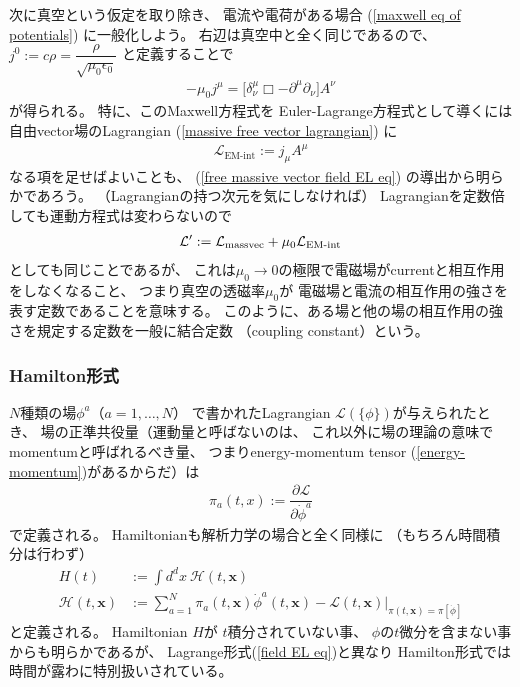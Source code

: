 次に真空という仮定を取り除き、
電流や電荷がある場合
(\ref{maxwell eq of potentials})
に一般化しよう。
右辺は真空中と全く同じであるので、
$j^0 := c \rho
= \dfrac{ \rho }
	{ \sqrt{\mu_0 \epsilon_0} }$
と定義することで
\begin{align}
	- \mu_0 j^\mu
=
    \bigg[
		\delta^\mu_\nu \Box
    - \partial^\mu \partial_\nu
    \bigg] A^\nu
\end{align}
が得られる。
特に、このMaxwell方程式を
Euler-Lagrange方程式として導くには
自由vector場のLagrangian
(\ref{massive free vector lagrangian})
に
\begin{align}
	\mathcal{L}_{\text{EM-int}}
:=
	j_\mu A^\mu
\label{EM int lagrangian}
\end{align}
なる項を足せばよいことも、
(\ref{free massive vector field EL eq})
の導出から明らかであろう。
（Lagrangianの持つ次元を気にしなければ）
Lagrangianを定数倍しても運動方程式は変わらないので
\begin{align}
	\mathcal{L}'
:=
	\mathcal{L}_{\rm massvec}
	+
	\mu_0 \mathcal{L}_{\text{EM-int}}
\end{align}
としても同じことであるが、
これは$\mu_0 \to 0$の極限で電磁場がcurrentと相互作用をしなくなること、
つまり真空の透磁率$\mu_0$が
電磁場と電流の相互作用の強さを表す定数であることを意味する。
このように、ある場と他の場の相互作用の強さを規定する定数を一般に結合定数
（coupling constant）という。

\subsubsection{Hamilton形式}

$N$種類の場$\phi^a$（$a = 1, \dots, N$）
で書かれたLagrangian
$\mathcal{L}(\{ \phi \})$が与えられたとき、
場の正準共役量（運動量と呼ばないのは、
これ以外に場の理論の意味でmomentumと呼ばれるべき量、
つまりenergy-momentum tensor (\ref{energy-momentum})があるからだ）は
\begin{align}
    \pi_a (t, x)
    := \dfrac{\partial \mathcal{L}}
        {\partial \dot{\phi}^a}
\end{align}
で定義される。
Hamiltonianも解析力学の場合と全く同様に
（もちろん時間積分は行わず）
\begin{subequations}
\begin{align}
    H (t)
    &:=
    \int d^d x\ 
        \mathcal{H} (t, \bm{x})
\\
    \mathcal{H} (t, \bm{x})
    &:=
    \sum_{a = 1}^N
        \pi_a (t, \bm{x})
        \dot{\phi}^a (t, \bm{x})
    -
    \mathcal{L}(t, \bm{x})
    \bigg|_{
        \pi(t, \bm{x})
        = \pi[\dot{\phi}]
    }
\end{align}
\end{subequations}
と定義される。
Hamiltonian $H$が
$t$積分されていない事、
$\phi$の$t$微分を含まない事からも明らかであるが、
Lagrange形式(\ref{field EL eq})と異なり
Hamilton形式では時間が露わに特別扱いされている。

